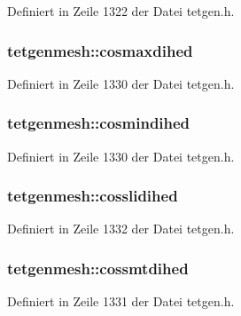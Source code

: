 Definiert in Zeile 1322 der Datei tetgen.\-h.

\hypertarget{classtetgenmesh_a9f7eadf1045c2b4c1c97438077609e8f}{
\subsubsection[{cosmaxdihed}]{ tetgenmesh\-::cosmaxdihed}}\label{classtetgenmesh_a9f7eadf1045c2b4c1c97438077609e8f}


Definiert in Zeile 1330 der Datei tetgen.\-h.

\hypertarget{classtetgenmesh_a0e58e1614215c6ec5886fb85692a9f04}{
\subsubsection[{cosmindihed}]{ tetgenmesh\-::cosmindihed}}\label{classtetgenmesh_a0e58e1614215c6ec5886fb85692a9f04}


Definiert in Zeile 1330 der Datei tetgen.\-h.

\hypertarget{classtetgenmesh_a5dbb7eb25c4da3be88fe6d643bcc0e84}{
\subsubsection[{cosslidihed}]{ tetgenmesh\-::cosslidihed}}\label{classtetgenmesh_a5dbb7eb25c4da3be88fe6d643bcc0e84}


Definiert in Zeile 1332 der Datei tetgen.\-h.

\hypertarget{classtetgenmesh_ad551e8a0e3089c279a782a721e031346}{
\subsubsection[{cossmtdihed}]{ tetgenmesh\-::cossmtdihed}}\label{classtetgenmesh_ad551e8a0e3089c279a782a721e031346}


Definiert in Zeile 1331 der Datei tetgen.\-h.

